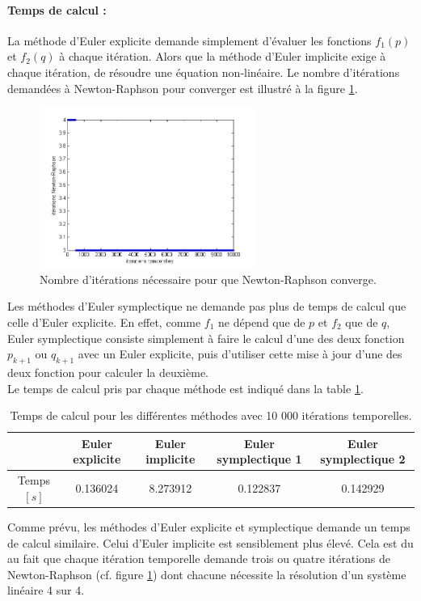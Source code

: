 \paragraph{Temps de calcul : }
La méthode d'Euler explicite demande simplement d'évaluer les fonctions $f_1(p)$ et $f_2(q)$ à chaque itération. Alors que la méthode d'Euler implicite exige à chaque itération, de résoudre une équation non-linéaire. Le nombre d'itérations demandées à Newton-Raphson pour converger est illustré à la figure \ref{IterNR}.

\begin{figure}
\centering
\includegraphics[width=7cm]{images/iterationNR.png}
\caption{Nombre d'itérations nécessaire pour que Newton-Raphson converge.}
\label{IterNR}
\end{figure}

Les méthodes d'Euler symplectique ne demande pas plus de temps de calcul que celle d'Euler explicite. En effet, comme $f_1$ ne dépend que de $p$ et $f_2$ que de $q$, Euler symplectique consiste simplement à faire le calcul d'une des deux fonction $p_{k+1}$ ou $q_{k+1}$ avec un Euler explicite, puis d'utiliser cette mise à jour d'une des deux fonction pour calculer la deuxième. \\
Le temps de calcul pris par chaque méthode est indiqué dans la table \ref{table_time}.

\begin{table}[h]
\centering
\begin{tabular}{|c|cccc|}
\hline
 & Euler explicite & Euler implicite & Euler symplectique 1 & Euler symplectique 2 \\
\hline
Temps $[s]$ & 0.136024 & 8.273912 & 0.122837 &  0.142929\\
\hline
\end{tabular}
\caption{Temps de calcul pour les différentes méthodes avec 10 000 itérations temporelles.}
\label{table_time}
\end{table}

Comme prévu, les méthodes d'Euler explicite et symplectique demande un temps de calcul similaire. Celui d'Euler implicite est sensiblement plus élevé. Cela est du au fait que chaque itération temporelle demande trois ou quatre itérations de Newton-Raphson (cf. figure \ref{IterNR}) dont chacune nécessite la résolution d'un système linéaire 4 sur 4.


